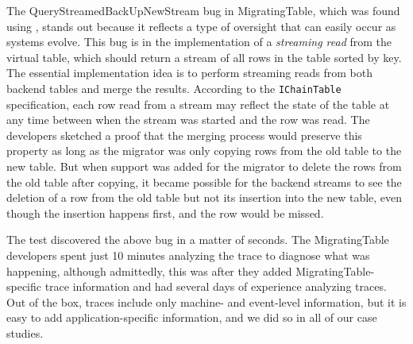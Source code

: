 The QueryStreamedBackUpNewStream bug in MigratingTable, which was found using \psharp, stands out because it reflects a type of oversight that can easily occur as systems evolve. This bug is in the implementation of a \emph{streaming read} from the virtual table, which should return a stream of all rows in the table sorted by key. The essential implementation idea is to perform streaming reads from both backend tables and merge the results. According to the \texttt{IChainTable} specification, each row read from a stream may reflect the state of the table at any time between when the stream was started and the row was read. The developers sketched a proof that the merging process would preserve this property as long as the migrator was only copying rows from the old table to the new table. But when support was added for the migrator to delete the rows from the old table after copying, it became possible for the backend streams to see the deletion of a row from the old table but not its insertion into the new table, even though the insertion happens first, and the row would be missed.

The \psharp test discovered the above bug in a matter of seconds. The MigratingTable developers spent just 10 minutes analyzing the trace to diagnose what was happening, although admittedly, this was after they added MigratingTable-specific trace information and had several days of experience analyzing traces. Out of the box, \psharp traces include only machine- and event-level information, but it is easy to add application-specific information, and we did so in all of our case studies.


